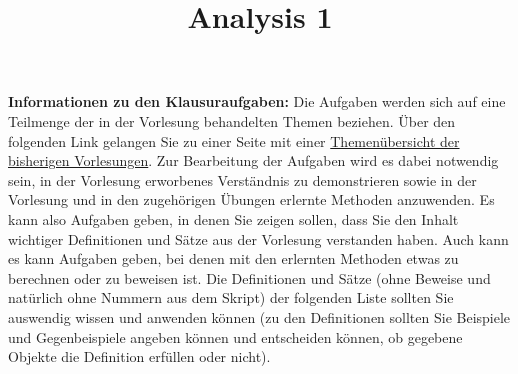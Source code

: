 \documentclass[10pt,a4paper,twoside]{article}
\title{Analysis 1}
\begin{document}
\pagestyle{fancy}
\setcounter{page}{1}

\maketitle

\textbf{Informationen zu den Klausuraufgaben:} Die Aufgaben werden sich auf eine Teilmenge der in der Vorlesung behandelten Themen beziehen. Über den folgenden Link gelangen Sie zu einer Seite mit einer 
\href{http://www.math.lmu.de/~philip/teaching/2017_calc1_forInfAndStatStudents/summary.html}{Themenübersicht der bisherigen Vorlesungen}. 
Zur Bearbeitung der Aufgaben wird es dabei notwendig sein, in der Vorlesung erworbenes Verständnis zu demonstrieren sowie in der Vorlesung und in den zugehörigen Übungen erlernte Methoden anzuwenden. Es kann also Aufgaben geben, in denen Sie zeigen sollen, dass Sie den Inhalt wichtiger Definitionen und Sätze aus der Vorlesung verstanden haben. Auch kann es kann Aufgaben geben, bei denen mit den erlernten Methoden etwas zu berechnen oder zu beweisen ist. Die Definitionen und Sätze (ohne Beweise und natürlich ohne Nummern aus dem Skript) der folgenden Liste sollten Sie auswendig wissen und anwenden können (zu den Definitionen sollten Sie Beispiele und Gegenbeispiele angeben können und entscheiden können, ob gegebene Objekte die Definition erfüllen oder nicht). 

\tableofcontents
\cleardoublepage

\setcounter{page}{1}
\fancyhead[LE,RO]{\rightmark}
\fancyhead[LO,RE]{\leftmark}
\fancyfoot[LE,RO]{\thepage}











\end{document}
